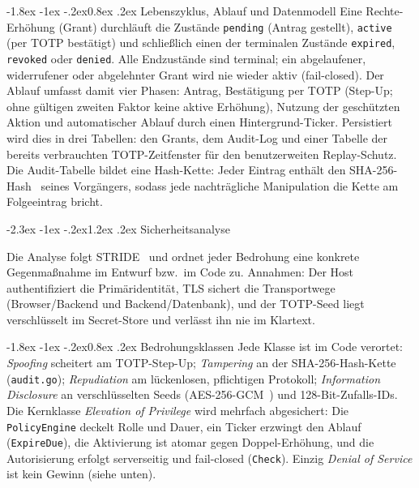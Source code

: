 \documentclass[11pt,a4paper]{article}
\makeatletter
\renewcommand\section{\@startsection{section}{1}{\z@}%
  {-2.3ex \@plus -1ex \@minus -.2ex}{1.2ex \@plus .2ex}%
  {\normalfont\Large\bfseries}}
\renewcommand\subsection{\@startsection{subsection}{2}{\z@}%
  {-1.8ex \@plus -1ex \@minus -.2ex}{0.8ex \@plus .2ex}%
  {\normalfont\large\bfseries}}
\makeatother
\begin{document}
\subsection{Lebenszyklus, Ablauf und Datenmodell}
Eine Rechte-Erhöhung (Grant) durchläuft die Zustände \texttt{pending} (Antrag
gestellt), \texttt{active} (per TOTP bestätigt) und schließlich einen der
terminalen Zustände \texttt{expired}, \texttt{revoked} oder \texttt{denied}.
Alle Endzustände sind terminal; ein abgelaufener, widerrufener oder abgelehnter
Grant wird nie wieder aktiv (fail-closed). Der Ablauf umfasst damit vier Phasen:
Antrag, Bestätigung per TOTP (Step-Up; ohne gültigen zweiten Faktor keine aktive
Erhöhung), Nutzung der geschützten Aktion und automatischer Ablauf durch einen
Hintergrund-Ticker. Persistiert wird dies in drei Tabellen:
den Grants, dem Audit-Log und einer Tabelle der bereits verbrauchten
TOTP-Zeitfenster für den benutzerweiten Replay-Schutz. Die Audit-Tabelle bildet
eine Hash-Kette: Jeder Eintrag enthält den SHA-256-Hash~\cite{fips180} seines
Vorgängers, sodass jede nachträgliche Manipulation die Kette am Folgeeintrag
bricht.

\section{Sicherheitsanalyse}

Die Analyse folgt STRIDE~\cite{msstride} und ordnet jeder Bedrohung eine
konkrete Gegenmaßnahme im Entwurf bzw.\ im Code zu. Annahmen: Der Host authentifiziert die
Primäridentität, TLS sichert die Transportwege (Browser/Backend und
Backend/Datenbank), und der TOTP-Seed liegt verschlüsselt im Secret-Store und
verlässt ihn nie im Klartext.

\subsection{Bedrohungsklassen}
Jede Klasse ist im Code verortet: \emph{Spoofing} scheitert am TOTP-Step-Up;
\emph{Tampering} an der SHA-256-Hash-Kette (\texttt{audit.go}); \emph{Repudiation}
am lückenlosen, pflichtigen Protokoll; \emph{Information Disclosure} an
verschlüsselten Seeds (AES-256-GCM~\cite{nistgcm}) und 128-Bit-Zufalls-IDs. Die Kernklasse
\emph{Elevation of Privilege} wird mehrfach abgesichert: Die \texttt{PolicyEngine}
deckelt Rolle und Dauer, ein Ticker erzwingt den Ablauf (\texttt{ExpireDue}), die
Aktivierung ist atomar gegen Doppel-Erhöhung, und die Autorisierung erfolgt
serverseitig und fail-closed (\texttt{Check}). Einzig \emph{Denial of Service}
ist kein Gewinn (siehe unten).
\end{document}
